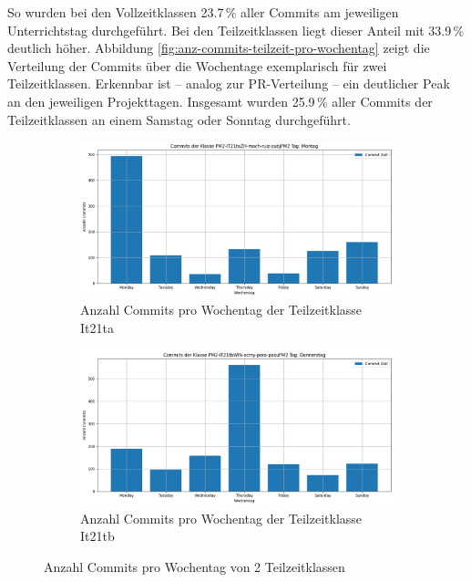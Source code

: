 So wurden bei den Vollzeitklassen 23.7\,\% aller Commits am jeweiligen Unterrichtstag durchgeführt. Bei den Teilzeitklassen liegt dieser Anteil mit 33.9\,\% deutlich höher. Abbildung \autoref{fig:anz-commits-teilzeit-pro-wochentag} zeigt die Verteilung der Commits über die Wochentage exemplarisch für zwei Teilzeitklassen. Erkennbar ist – analog zur PR-Verteilung – ein deutlicher Peak an den jeweiligen Projekttagen. Insgesamt wurden 25.9\,\% aller Commits der Teilzeitklassen an einem Samstag oder Sonntag durchgeführt.

\begin{figure}[htbp]
    \centering
    \begin{subfigure}[b]{0.48\textwidth}
        \centering
        \includegraphics[width=\textwidth]{Figures/commits-klasse-per-wochentag-21ta.png}
         \caption{Anzahl Commits pro Wochentag der Teilzeitklasse It21ta}
        \label{fig:anzahl-commits-pro-wochentag-it21ta}
    \end{subfigure}
    \hfill
    \begin{subfigure}[b]{0.48\textwidth}
        \centering
        \includegraphics[width=\textwidth]{Figures/commits-klasse-per-wochentag-21tb.png}
         \caption{Anzahl Commits pro Wochentag der Teilzeitklasse It21tb}
        \label{fig:anzahl-commits-pro-wochentag-it21tb}
    \end{subfigure}
    \caption{Anzahl Commits pro Wochentag von 2 Teilzeitklassen}
    \label{fig:anz-commits-teilzeit-pro-wochentag}
\end{figure}

